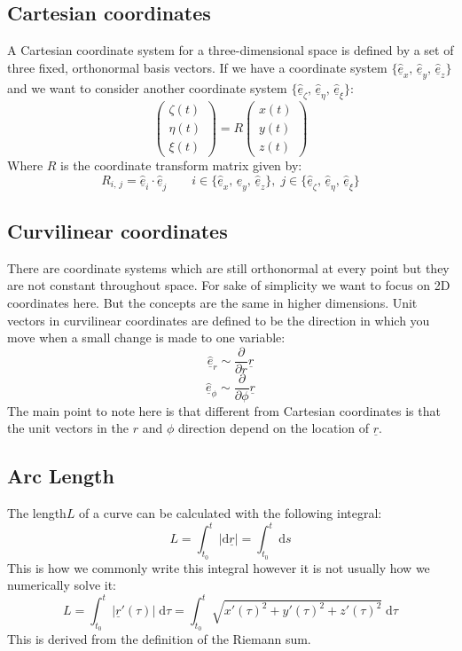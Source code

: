 \documentclass[12pt]{article}
\newcommand{\uvec}[1]{\underline{\hat{#1}}}
\newcommand{\bvec}[1]{\uvec{e}_#1}
\begin{document}
\subsection*{Cartesian coordinates}
A Cartesian coordinate system for a three-dimensional space is defined by a set of three fixed, orthonormal basis vectors. If we have a coordinate system \(\{\bvec{x},\,\bvec{y},\,\bvec{z}\}\) and we want to consider another coordinate system \(\{\bvec{\zeta},\,\bvec{\eta},\,\bvec{\xi}\}\):
\[\begin{pmatrix}
    \zeta(t) \\
    \eta(t) \\
    \xi(t)
\end{pmatrix}=R\begin{pmatrix}
    x(t) \\
    y(t) \\
    z(t)
\end{pmatrix}\]
Where \(R\) is the coordinate transform matrix given by:
\[R_{i,\,j}=\bvec{i}\cdot\bvec{j}\qquad i\in\{\bvec{x},\,\bvec{y},\,\bvec{z}\},\;j\in\{\bvec{\zeta},\,\bvec{\eta},\,\bvec{\xi}\}\]
\subsection*{Curvilinear coordinates}
There are coordinate systems which are still orthonormal at every point but they are not constant throughout space. For sake of simplicity we want to focus on 2D coordinates here. But the concepts are the same in higher dimensions. Unit vectors in curvilinear coordinates are defined to be the direction in which you move when a small change is made to one variable:
\[\bvec{r}\sim\frac{\partial}{\partial r}\underline{r}\]
\[\bvec{\phi}\sim\frac{\partial}{\partial\phi}\underline{r}\]
The main point to note here is that different from Cartesian coordinates is that the unit vectors in the \(r\) and \(\phi\) direction depend on the location of \(\underline{r}\).
\subsection*{Arc Length}
The length\(L\) of a curve can be calculated with the following integral:
\[L=\int^t_{t_0}\vert\text{d}\underline{r}\vert=\int^t_{t_0}\text{d}s\]
This is how we commonly write this integral however it is not usually how we numerically solve it:
\[L=\int^t_{t_0}\vert\underline{r}'(\tau)\vert\;\text{d}\tau=\int^t_{t_0}\sqrt{x'(\tau)^2+y'(\tau)^2+z'(\tau)^2}\;\text{d}\tau\]
This is derived from the definition of the Riemann sum.
\end{document}
